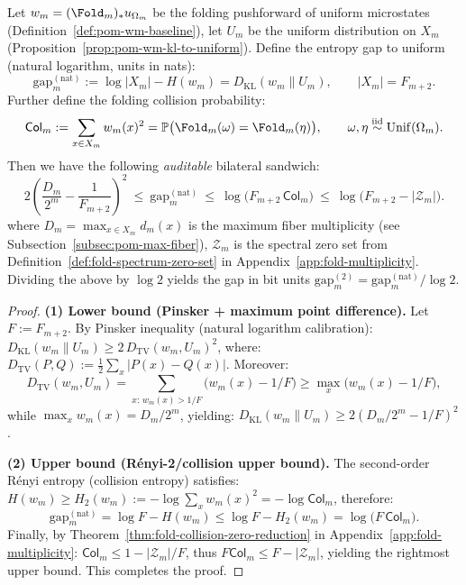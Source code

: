 \begin{theorem}\label{thm:pom-spectral-information-sandwich}
Let $w_m=(\Fold_m)_*u_{\Omega_m}$ be the folding pushforward of uniform microstates (Definition~\ref{def:pom-wm-baseline}), let $U_m$ be the uniform distribution on $X_m$ (Proposition~\ref{prop:pom-wm-kl-to-uniform}).
Define the entropy gap to uniform (natural logarithm, units in nats):
\[
\mathrm{gap}_m^{(\mathrm{nat})}
:=\log|X_m|-H(w_m)
=D_{\mathrm{KL}}(w_m\|U_m),
\qquad |X_m|=F_{m+2}.
\]
Further define the folding collision probability:
\[
\mathsf{Col}_m:=\sum_{x\in X_m}w_m(x)^2
=\mathbb{P}\bigl(\Fold_m(\omega)=\Fold_m(\eta)\bigr),
\qquad \omega,\eta\stackrel{\mathrm{iid}}{\sim}\mathrm{Unif}(\Omega_m).
\]
Then we have the following \emph{auditable} bilateral sandwich:
\[
\boxed{\;
2\left(\frac{D_m}{2^m}-\frac{1}{F_{m+2}}\right)^2
\ \le\
\mathrm{gap}_m^{(\mathrm{nat})}
\ \le\
\log\!\bigl(F_{m+2}\,\mathsf{Col}_m\bigr)
\ \le\
\log\!\bigl(F_{m+2}-|\mathcal Z_m|\bigr).\;}
\]
where $D_m=\max_{x\in X_m}d_m(x)$ is the maximum fiber multiplicity (see Subsection~\ref{subsec:pom-max-fiber}), $\mathcal Z_m$ is the spectral zero set from Definition~\ref{def:fold-spectrum-zero-set} in Appendix~\ref{app:fold-multiplicity}.
Dividing the above by $\log 2$ yields the gap in bit units $\mathrm{gap}_m^{(2)}=\mathrm{gap}_m^{(\mathrm{nat})}/\log 2$.
\end{theorem}
\begin{proof}
\textbf{(1) Lower bound (Pinsker + maximum point difference).}
Let $F:=F_{m+2}$.
By Pinsker inequality (natural logarithm calibration):
\(
D_{\mathrm{KL}}(w_m\|U_m)\ge 2\,D_{\mathrm{TV}}(w_m,U_m)^2
\),
where:
\(
D_{\mathrm{TV}}(P,Q):=\frac12\sum_x|P(x)-Q(x)|
\).
Moreover:
\[
D_{\mathrm{TV}}(w_m,U_m)
=\sum_{x:\,w_m(x)>1/F}\bigl(w_m(x)-1/F\bigr)
\ge \max_x\bigl(w_m(x)-1/F\bigr),
\]
while $\max_x w_m(x)=D_m/2^m$, yielding:
\(
D_{\mathrm{KL}}(w_m\|U_m)\ge 2(D_m/2^m-1/F)^2
\).
\par
\textbf{(2) Upper bound (Rényi-2/collision upper bound).}
The second-order Rényi entropy (collision entropy) satisfies:
\(
H(w_m)\ge H_2(w_m):=-\log\sum_x w_m(x)^2=-\log \mathsf{Col}_m
\),
therefore:
\[
\mathrm{gap}_m^{(\mathrm{nat})}
=\log F-H(w_m)
\le \log F-H_2(w_m)
=\log\bigl(F\,\mathsf{Col}_m\bigr).
\]
Finally, by Theorem~\ref{thm:fold-collision-zero-reduction} in Appendix~\ref{app:fold-multiplicity}:
\(
\mathsf{Col}_m\le 1-|\mathcal Z_m|/F
\),
thus $F\mathsf{Col}_m\le F-|\mathcal Z_m|$, yielding the rightmost upper bound. This completes the proof.
\end{proof}

